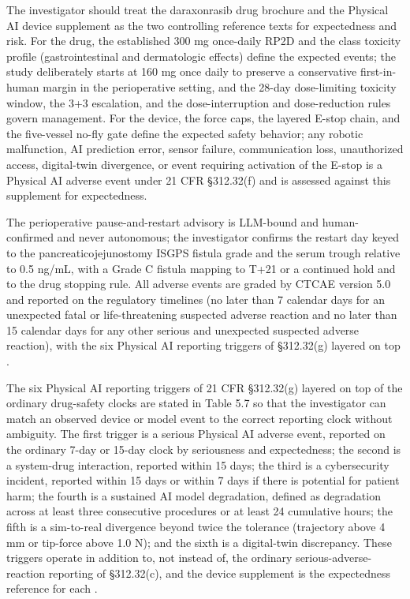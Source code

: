 The investigator should treat the daraxonrasib drug brochure and the Physical AI
device supplement as the two controlling reference texts for expectedness and risk.
For the drug, the established 300 mg once-daily RP2D and the class toxicity profile
(gastrointestinal and dermatologic effects) define the expected events; the study
deliberately starts at 160 mg once daily to preserve a conservative first-in-human
margin in the perioperative setting, and the 28-day dose-limiting toxicity window,
the 3+3 escalation, and the dose-interruption and dose-reduction rules govern
management. For the device, the force caps, the layered E-stop chain, and the
five-vessel no-fly gate define the expected safety behavior; any robotic
malfunction, AI prediction error, sensor failure, communication loss, unauthorized
access, digital-twin divergence, or event requiring activation of the E-stop is a
Physical AI adverse event under 21 CFR \S 312.32(f) and is assessed against this
supplement for expectedness. 

The perioperative pause-and-restart advisory is
LLM-bound and human-confirmed and never autonomous; the investigator confirms the
restart day keyed to the pancreaticojejunostomy ISGPS fistula grade and the serum
trough relative to 0.5 ng/mL, with a Grade C fistula mapping to T+21 or a continued
hold and to the drug stopping rule. All adverse events are graded by CTCAE version
5.0 and reported on the regulatory timelines (no later than 7 calendar days for an
unexpected fatal or life-threatening suspected adverse reaction and no later than
15 calendar days for any other serious and unexpected suspected adverse reaction),
with the six Physical AI reporting triggers of \S 312.32(g) layered on top
\cite{daraxwhipple,cfr312paiuni,ichpaistduni}.

The six Physical AI reporting triggers of 21 CFR \S 312.32(g) layered on top of the
ordinary drug-safety clocks are stated in Table 5.7 so that the investigator can
match an observed device or model event to the correct reporting clock without
ambiguity. The first trigger is a serious Physical AI adverse event, reported on the
ordinary 7-day or 15-day clock by seriousness and expectedness; the second is a
system-drug interaction, reported within 15 days; the third is a cybersecurity
incident, reported within 15 days or within 7 days if there is potential for patient
harm; the fourth is a sustained AI model degradation, defined as degradation across
at least three consecutive procedures or at least 24 cumulative hours; the fifth is a
sim-to-real divergence beyond twice the tolerance (trajectory above 4 mm or tip-force
above 1.0 N); and the sixth is a digital-twin discrepancy. These triggers operate in
addition to, not instead of, the ordinary serious-adverse-reaction reporting of
\S 312.32(c), and the device supplement is the expectedness reference for each
\cite{cfr312paiuni,clintrustpai,paiautospons}.

